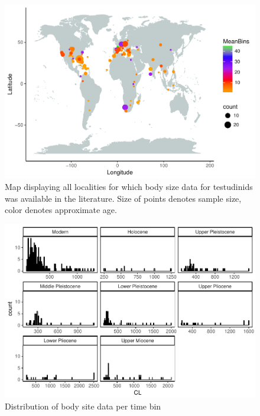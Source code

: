 \documentclass[]{article}
\begin{document}
\begin{figure}[htbp]
\centering
\includegraphics{MA_JJ_files/figure-latex/Map body size data set-1.pdf}
\caption{Map displaying all localities for which body size data for
testudinids was available in the literature. Size of points denotes
sample size, color denotes approximate age.}
\end{figure}

\begin{figure}[htbp]
\centering
\includegraphics{MA_JJ_files/figure-latex/Histograms of body size data-1.pdf}
\caption{Distribution of body site data per time bin}
\end{figure}
\end{document}
